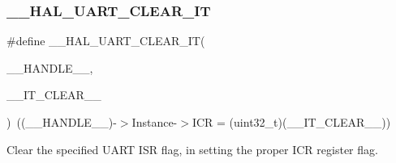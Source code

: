 \subsubsection{\texorpdfstring{\_\_HAL\_UART\_CLEAR\_IT}{\_\_HAL\_UART\_CLEAR\_IT}}
{\footnotesize\ttfamily \#define \+\_\+\+\_\+\+H\+A\+L\+\_\+\+U\+A\+R\+T\+\_\+\+C\+L\+E\+A\+R\+\_\+\+IT(\begin{DoxyParamCaption}\item[{}]{\+\_\+\+\_\+\+H\+A\+N\+D\+L\+E\+\_\+\+\_\+,  }\item[{}]{\+\_\+\+\_\+\+I\+T\+\_\+\+C\+L\+E\+A\+R\+\_\+\+\_\+ }\end{DoxyParamCaption})~((\+\_\+\+\_\+\+H\+A\+N\+D\+L\+E\+\_\+\+\_\+)-\/$>$Instance-\/$>$I\+CR = (uint32\+\_\+t)(\+\_\+\+\_\+\+I\+T\+\_\+\+C\+L\+E\+A\+R\+\_\+\+\_\+))}



Clear the specified U\+A\+RT I\+SR flag, in setting the proper I\+CR register flag. 



